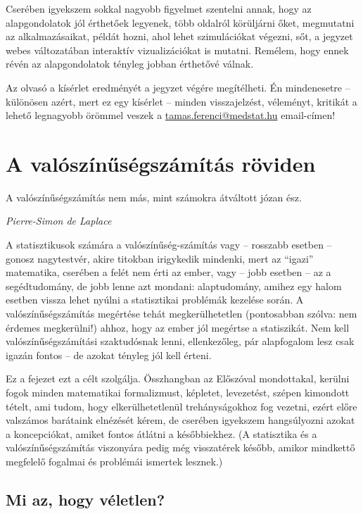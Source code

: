 \documentclass[magyar,]{book}
\begin{document}
Cserében igyekszem sokkal nagyobb figyelmet szentelni annak, hogy az alapgondolatok jól érthetőek legyenek, több oldalról körüljárni őket, megmutatni az alkalmazásaikat, példát hozni, ahol lehet szimulációkat végezni, sőt, a jegyzet webes változatában interaktív vizualizációkat is mutatni. Remélem, hogy ennek révén az alapgondolatok tényleg jobban érthetővé válnak.

Az olvasó a kísérlet eredményét a jegyzet végére megítélheti. Én mindenesetre -- különösen azért, mert ez egy kísérlet -- minden visszajelzést, véleményt, kritikát a lehető legnagyobb örömmel veszek a \url{tamas.ferenci@medstat.hu} email-címen!

\hypertarget{a-valuxf3szuxednux171suxe9gszuxe1muxedtuxe1s-ruxf6viden}{%
\chapter{A valószínűségszámítás röviden}\label{a-valuxf3szuxednux171suxe9gszuxe1muxedtuxe1s-ruxf6viden}}

\epigraph{A valószínűségszámítás nem más, mint számokra átváltott józan ész.}{\textit{Pierre-Simon de Laplace}}

A statisztikusok számára a valószínűség-számítás vagy -- rosszabb esetben -- gonosz nagytestvér, akire titokban irigykedik mindenki, mert az \enquote{igazi} matematika, cserében a felét nem érti az ember, vagy -- jobb esetben -- az a segédtudomány, de jobb lenne azt mondani: alaptudomány, amihez egy halom esetben vissza lehet nyúlni a statisztikai problémák kezelése során. A valószínűségszámítás megértése tehát megkerülhetetlen (pontosabban szólva: nem érdemes megkerülni!) ahhoz, hogy az ember jól megértse a statiszikát. Nem kell valószínűségszámítási szaktudósnak lenni, ellenkezőleg, pár alapfogalom lesz csak igazán fontos -- de azokat tényleg jól kell érteni.

Ez a fejezet ezt a célt szolgálja. Összhangban az Előszóval mondottakal, kerülni fogok minden matematikai formalizmust, képletet, levezetést, szépen kimondott tételt, ami tudom, hogy elkerülhetetlenül trehányságokhoz fog vezetni, ezért előre valszámos barátaink elnézését kérem, de cserében igyekszem hangsúlyozni azokat a koncepciókat, amiket fontos átlátni a későbbiekhez. (A statisztika és a valószínűségszámítás viszonyára pedig még visszatérek később, amikor mindkettő megfelelő fogalmai és problémái ismertek lesznek.)

\hypertarget{mi-az-hogy-vuxe9letlen}{%
\section{Mi az, hogy véletlen?}\label{mi-az-hogy-vuxe9letlen}}
\end{document}
